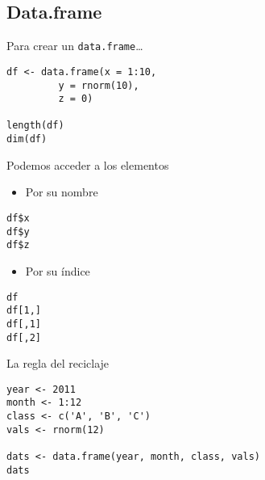 \documentclass[xcolor={usenames,svgnames,dvipsnames}]{beamer}
\begin{document}
\subsection{Data.frame}
\label{sec-4-2}
\begin{frame}[fragile,label=sec-4-2-1]{Para crear un \texttt{data.frame}\ldots{}}
 \lstset{language=R,numbers=none}
\begin{lstlisting}
df <- data.frame(x = 1:10,
		 y = rnorm(10),
		 z = 0)

length(df)
dim(df)
\end{lstlisting}
\end{frame}

\begin{frame}[fragile,label=sec-4-2-2]{Podemos acceder a los elementos}
 \begin{itemize}
\item Por su nombre
\end{itemize}
\lstset{language=R,numbers=none}
\begin{lstlisting}
df$x
df$y
df$z
\end{lstlisting}

\begin{itemize}
\item Por su índice
\end{itemize}
\lstset{language=R,numbers=none}
\begin{lstlisting}
df
df[1,]
df[,1]
df[,2]
\end{lstlisting}
\end{frame}
\begin{frame}[fragile,label=sec-4-2-3]{La regla del reciclaje}
 \lstset{language=R,numbers=none}
\begin{lstlisting}
year <- 2011
month <- 1:12
class <- c('A', 'B', 'C')
vals <- rnorm(12)

dats <- data.frame(year, month, class, vals)
dats
\end{lstlisting}
\end{frame}
\end{document}
